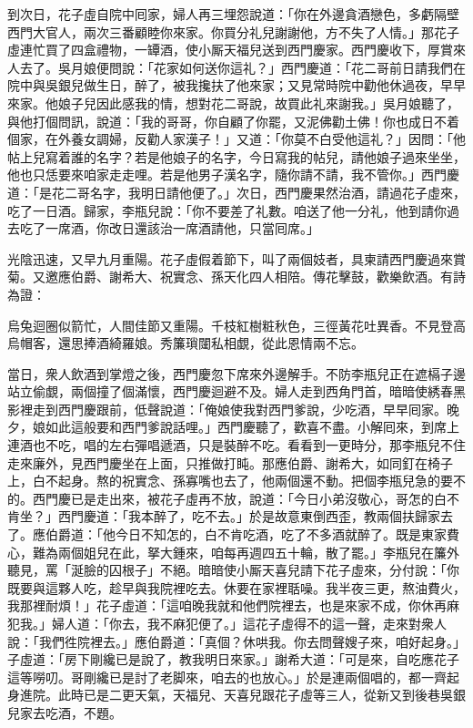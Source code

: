 到次日，花子虛自院中囘家，婦人再三埋怨說道：「你在外邊貪酒戀色，多虧隔壁西門大官人，兩次三番顧睦你來家。你買分礼兒謝謝他，方不失了人情。」那花子虛連忙買了四盒禮物，一罈酒，使小厮天福兒送到西門慶家。西門慶收下，厚賞來人去了。吳月娘便問說：「花家如何送你這礼？」西門慶道：「花二哥前日請我們在院中與吳銀兒做生日，醉了，被我攙扶了他來家；又見常時院中勸他休過夜，早早來家。他娘子兒因此感我的情，想對花二哥說，故買此礼來謝我。」{}吳月娘聽了，與他打個問訊，說道：「我的哥哥，你自顧了你罷，又泥佛勸土佛！你也成日不着個家，在外養女調婦，反勸人家漢子！」又道：「你莫不白受他這礼？」因問：「他帖上兒寫着誰的名字？若是他娘子的名字，今日寫我的帖兒，請他娘子過來坐坐，他也只恁要來咱家走走哩。{}若是他男子漢名字，隨你請不請，我不管你。」西門慶道：「是花二哥名字，我明日請他便了。」次日，西門慶果然治酒，請過花子虛來，吃了一日酒。歸家，李瓶兒說：「你不要差了礼數。咱送了他一分礼，他到請你過去吃了一席酒，你改日還該治一席酒請他，只當囘席。」

光陰迅速，又早九月重陽。花子虛假着節下，叫了兩個妓者，具柬請西門慶過來賞菊。又邀應伯爵、謝希大、祝實念、孫天化四人相陪。傳花擊鼓，歡樂飲酒。有詩為證：

烏兔迴圈似箭忙，人間佳節又重陽。千枝紅樹粧秋色，三徑黃花吐異香。不見登高烏帽客，還思捧酒綺羅娘。秀簾瑣闥私相覷，從此恩情兩不忘。

當日，衆人飲酒到掌燈之後，西門慶忽下席來外邊解手。不防李瓶兒正在遮槅子邊站立偷覷，兩個撞了個滿懷，{}西門慶迴避不及。婦人走到西角門首，暗暗使綉春黑影裡走到西門慶跟前，低聲說道：「俺娘使我對西門爹說，少吃酒，早早囘家。晚夕，娘如此這般要和西門爹說話哩。」西門慶聽了，歡喜不盡。小解囘來，到席上連酒也不吃，唱的左右彈唱遞酒，只是裝醉不吃。看看到一更時分，那李瓶兒不住走來廉外，見西門慶坐在上面，只推做打盹。那應伯爵、謝希大，如同釘在椅子上，白不起身。熬的祝實念、孫寡嘴也去了，他兩個還不動。把個李瓶兒急的要不的。西門慶已是走出來，被花子虛再不放，說道：「今日小弟沒敬心，哥怎的白不肯坐？」西門慶道：「我本醉了，吃不去。」於是故意東倒西歪，教兩個扶歸家去了。應伯爵道：「他今日不知怎的，白不肯吃酒，吃了不多酒就醉了。既是東家費心，難為兩個姐兒在此，拏大鍾來，咱每再週四五十輪，散了罷。」李瓶兒在簾外聽見，罵「涎臉的囚根子」不絕。暗暗使小厮天喜兒請下花子虛來，分付說：「你既要與這夥人吃，趁早與我院裡吃去。休要在家裡聒噪。我半夜三更，熬油費火，我那裡耐煩！」花子虛道：「這咱晚我就和他們院裡去，也是來家不成，你休再麻犯我。」婦人道：「你去，我不麻犯便了。」這花子虛得不的這一聲，走來對衆人說：「我們徃院裡去。」應伯爵道：「真個？休哄我。你去問聲嫂子來，咱好起身。」子虛道：「房下剛纔已是說了，教我明日來家。」謝希大道：「可是來，自吃應花子這等嘮叨。哥剛纔已是討了老脚來，咱去的也放心。」於是連兩個唱的，都一齊起身進院。此時已是二更天氣，天福兒、天喜兒跟花子虛等三人，從新又到後巷吳銀兒家去吃酒，不題。

